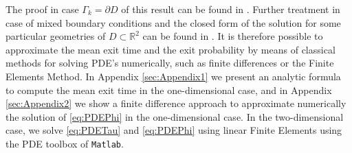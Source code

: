 \noindent The proof in case $\Gamma_k = \partial D$ of this result can be found in \cite{Sirovich2010}. Further treatment in case of mixed boundary conditions and the closed form of the solution for some particular geometries of $D \subset \mathbb{R}^2$ can be found in \cite{Grebenkov2014}. It is therefore possible to approximate the mean exit time and the exit probability by means of classical methods for solving PDE's numerically, such as finite differences or the Finite Elements Method. In Appendix \ref{sec:Appendix1} we present an analytic formula to compute the mean exit time in the one-dimensional case, and in Appendix \ref{sec:Appendix2} we show a finite difference approach to approximate numerically the solution of \eqref{eq:PDEPhi} in the one-dimensional case. In the two-dimensional case, we solve \eqref{eq:PDETau} and \eqref{eq:PDEPhi} using linear Finite Elements using the PDE toolbox of \texttt{Matlab}.

